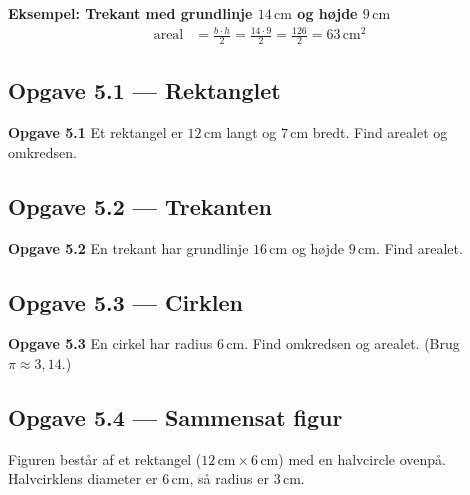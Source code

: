 \documentclass[11pt,a4paper]{article}
\begin{document}
\textbf{Eksempel: Trekant med grundlinje $14\,\text{cm}$ og højde $9\,\text{cm}$}
\begin{align*}
  \text{areal} &= \tfrac{b \cdot h}{2}
                = \tfrac{14 \cdot 9}{2}
                = \tfrac{126}{2}
                = 63\,\text{cm}^{2}
\end{align*}

\subsection*{Opgave 5.1 --- Rektanglet}

\begin{opgavebox}
\textbf{Opgave 5.1} \quad Et rektangel er $12\,\text{cm}$ langt og
$7\,\text{cm}$ bredt. Find arealet og omkredsen.
\end{opgavebox}

\subsection*{Opgave 5.2 --- Trekanten}

\begin{opgavebox}
\textbf{Opgave 5.2} \quad En trekant har grundlinje $16\,\text{cm}$ og højde
$9\,\text{cm}$. Find arealet.
\end{opgavebox}

\subsection*{Opgave 5.3 --- Cirklen}

\begin{opgavebox}
\textbf{Opgave 5.3} \quad En cirkel har radius $6\,\text{cm}$. Find omkredsen
og arealet. \hfill {\small\color{inksoft}(Brug $\pi \approx 3{,}14$.)}
\end{opgavebox}

\subsection*{Opgave 5.4 --- Sammensat figur}

\noindent
Figuren består af et rektangel ($12\,\text{cm} \times 6\,\text{cm}$) med en
halvcircle ovenpå. Halvcirklens diameter er $6\,\text{cm}$, så radius er
$3\,\text{cm}$.

\begin{center}
\end{center}
\end{document}
